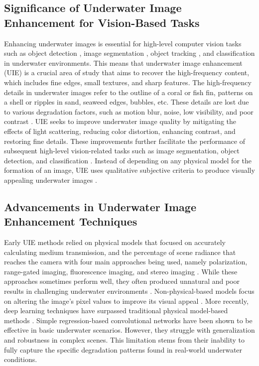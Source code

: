 \documentclass[3p,12pt,authoryear]{elsarticle}
\begin{document}
\subsection{Significance of Underwater Image Enhancement for Vision-Based Tasks}
Enhancing underwater images is essential for high-level computer vision tasks such as object detection \cite{a10, a11, a12}, image segmentation \cite{a13, a14}, object tracking \cite{a15}, and classification \cite{a16} in underwater environments. This means that underwater image enhancement (UIE) is a crucial area of study that aims to recover the high-frequency content, which includes fine edges, small textures, and sharp features. The high-frequency details in underwater images refer to the outline of a coral or fish fin, patterns on a shell or ripples in sand, seaweed edges, bubbles, etc. These details are lost due to various degradation factors, such as motion blur, noise, low visibility, and poor contrast \cite{a1}. UIE seeks to improve underwater image quality by mitigating the effects of light scattering, reducing color distortion, enhancing contrast, and restoring fine details. These improvements further facilitate the performance of subsequent high-level vision-related tasks such as image segmentation, object detection, and classification \cite{a2, a3}. Instead of depending on any physical model for the formation of an image, UIE uses qualitative subjective criteria to produce visually appealing underwater images \cite{a4}.

\subsection{Advancements in Underwater Image Enhancement Techniques}
Early UIE methods relied on physical models that focused on accurately calculating medium transmission, and the percentage of scene radiance that reaches the camera \cite{du2024physicalmodelguidedframeworkunderwater} with four main approaches being used, namely polarization, range-gated imaging, fluorescence imaging, and stereo imaging \cite{10.1007/s11036-017-0863-4, TIAN2018515, CHEN20134514, CHEN20142090, Raveendran2021UnderwaterIE}. While these approaches sometimes perform well, they often produced unnatural and poor results in challenging underwater environments \cite{10.1109/TIP.2011.2179666}. Non-physical-based models focus on altering the image's pixel values to improve its visual appeal \cite{Raveendran2021UnderwaterIE}. More recently, deep learning techniques have surpassed traditional physical model-based methods \cite{cong2024comprehensivesurveyunderwaterimage, 9885529}. Simple regression-based convolutional networks have been shown to be effective in basic underwater scenarios. However, they struggle with generalization and robustness in complex scenes. This limitation stems from their inability to fully capture the specific degradation patterns found in real-world underwater conditions.
\end{document}
